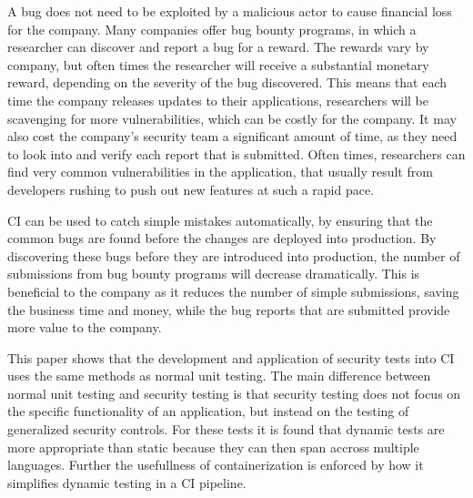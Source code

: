 	A bug does not need to be exploited by a malicious actor to cause financial loss for the company. Many companies offer bug bounty programs, in which a researcher can discover and report a bug 
    for a reward. The rewards vary by company, but often times the researcher will receive a substantial monetary reward, depending on the severity of the bug discovered. This means that each time 
    the company releases updates to their applications, researchers will be scavenging for more vulnerabilities, which can be costly for the company. It may also cost the company's security team a 
    significant amount of time, as they need to look into and verify each report that is submitted. Often times, researchers can find very common vulnerabilities in the application, that usually 
    result from developers rushing to push out new features at such a rapid pace.

	CI can be used to catch simple mistakes automatically, by ensuring that the common bugs are found before the changes are deployed into production. By discovering these bugs before they are introduced 
    into production, the number of submissions from bug bounty programs will decrease dramatically. This is beneficial to the company as it reduces the number of simple submissions, saving the business
    time and money, while the bug reports that are submitted provide more value to the company.

    This paper shows that the development and application of security tests into CI uses the same methods as normal unit testing. The main difference between normal unit testing and security testing
    is that security testing does not focus on the specific functionality of an application, but instead on the testing of generalized security controls. For these tests it is found that dynamic
    tests are more appropriate than static because they can then span accross multiple languages. Further the usefullness of containerization is enforced by how it simplifies dynamic testing in a CI
    pipeline.
